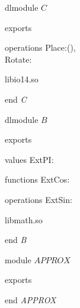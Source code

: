 {\small\sf dlmodule} $C$
\begin{interface}{exports}
\begin{modulesignature}{operations}
Place:\Int  \X \Int  \Oto (), \\
Rotate:\Lp \Int  \X \Int  \Rp  \X \Real  \Oto \Int  \X \Int 
\end{modulesignature}
\end{interface}
\begin{expr}
\Dquote libio14.so \Dquote \end{expr}
{\small\sf end} {\it C}

{\small\sf dlmodule} $B$
\begin{interface}{exports}
\begin{modulesignature}{values}
ExtPI:\Real 
\end{modulesignature}
\begin{modulesignature}{functions}
ExtCos:\Real  \To \Real 
\end{modulesignature}
\begin{modulesignature}{operations}
ExtSin:\Real  \Oto \Real 
\end{modulesignature}
\end{interface}
\begin{expr}
\Dquote libmath.so \Dquote \end{expr}
{\small\sf end} {\it B}

{\small\sf module} $APPROX$
\begin{interface}{exports}
\end{interface}
\kDefinitions
\kValues
{}
{\small\sf end} {\it APPROX}

